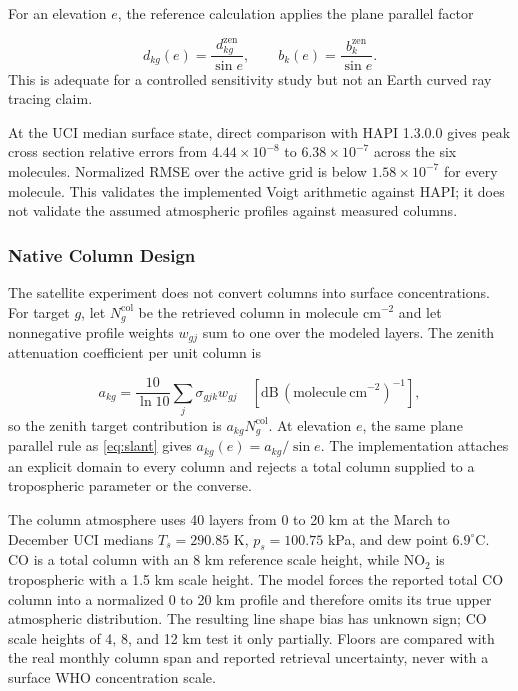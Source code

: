 \documentclass[conference]{IEEEtran}
\begin{document}
For an elevation $e$, the reference calculation applies the plane parallel factor

\begin{equation}
d_{kg}(e)=\frac{d^{\mathrm{zen}}_{kg}}{\sin e}, \qquad
b_k(e)=\frac{b_k^{\mathrm{zen}}}{\sin e}.
\label{eq:slant}
\end{equation}
This is adequate for a controlled sensitivity study but not an Earth curved ray tracing claim.

At the UCI median surface state, direct comparison with HAPI 1.3.0.0 gives peak cross section relative errors from $4.44\times10^{-8}$ to $6.38\times10^{-7}$ across the six molecules. Normalized RMSE over the active grid is below $1.58\times10^{-7}$ for every molecule. This validates the implemented Voigt arithmetic against HAPI; it does not validate the assumed atmospheric profiles against measured columns.

\subsubsection{Native Column Design}

The satellite experiment does not convert columns into surface concentrations. For target $g$, let $N_g^{\mathrm{col}}$ be the retrieved column in molecule cm$^{-2}$ and let nonnegative profile weights $w_{gj}$ sum to one over the modeled layers. The zenith attenuation coefficient per unit column is

\begin{equation}
a_{kg}=\frac{10}{\ln 10}\sum_j \sigma_{gjk}w_{gj}
\quad [\mathrm{dB}\,(\mathrm{molecule\ cm}^{-2})^{-1}],
\label{eq:columndesign}
\end{equation}
so the zenith target contribution is $a_{kg}N_g^{\mathrm{col}}$. At elevation $e$, the same plane parallel rule as \eqref{eq:slant} gives $a_{kg}(e)=a_{kg}/\sin e$. The implementation attaches an explicit domain to every column and rejects a total column supplied to a tropospheric parameter or the converse.

The column atmosphere uses 40 layers from 0 to 20 km at the March to December UCI medians $T_s=290.85$ K, $p_s=100.75$ kPa, and dew point $6.9^\circ$C. CO is a total column with an 8 km reference scale height, while NO$_2$ is tropospheric with a 1.5 km scale height. The model forces the reported total CO column into a normalized 0 to 20 km profile and therefore omits its true upper atmospheric distribution. The resulting line shape bias has unknown sign; CO scale heights of 4, 8, and 12 km test it only partially. Floors are compared with the real monthly column span and reported retrieval uncertainty, never with a surface WHO concentration scale.
\end{document}
